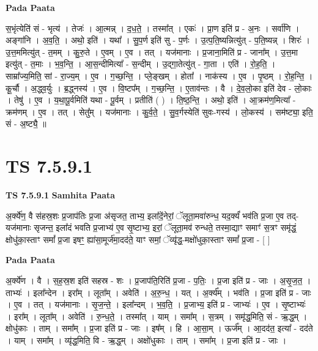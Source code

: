 \documentclass[17pt]{extarticle}
\begin{document}
\textbf{Pada Paata} \newline

स॒भृंत्येति॑ सं - भृत्य॑ । तेजः॑ । आ॒त्मन्न् । द॒ध॒ते॒ । तस्मा᳚त् । एकः॑ । प्रा॒ण इति॑ प्र - अ॒नः । सर्वा॑णि । अङ्गा॑नि । अ॒व॒ति॒ । अथो॒ इति॑ । यथा᳚ । सु॒प॒र्ण इति॑ सु - प॒र्णः । उ॒त्प॒ति॒ष्यन्नित्यु॑त् - प॒ति॒ष्यन्न् । शिरः॑ । उ॒त्त॒ममित्यु॑त् - त॒मम् । कु॒रु॒ते । ए॒वम् । ए॒व । तत् । यज॑मानाः । प्र॒जाना॒मिति॑ प्र - जाना᳚म् । उ॒त्त॒मा इत्यु॑त् - त॒माः । भ॒व॒न्ति॒ । आ॒स॒न्दीमित्या᳚ - स॒न्दीम् । उ॒द्गा॒तेत्यु॑त् - गा॒ता । एति॑ । रो॒ह॒ति॒ । साम्रा᳚ज्य॒मिति॒ सां - रा॒ज्य॒म् । ए॒व । ग॒च्छ॒न्ति॒ । प्ले॒ङ्खम् । होता᳚ । नाक॑स्य । ए॒व । पृ॒ष्ठम् । रो॒ह॒न्ति॒ । कू॒र्चौ । अ॒द्ध्व॒र्युः । ब्र॒द्ध्नस्य॑ । ए॒व । वि॒ष्टप᳚म् । ग॒च्छ॒न्ति॒ । ए॒ताव॑न्तः । वै । दे॒व॒लो॒का इति॑ देव - लो॒काः । तेषु॑ । ए॒व । य॒था॒पू॒र्वमिति॑ यथा - पू॒र्वम् । प्रतीति॑ ( ) । ति॒ष्ठ॒न्ति॒ । अथो॒ इति॑ । आ॒क्रम॑ण॒मित्या᳚ - क्रम॑णम् । ए॒व । तत् । सेतु᳚म् । यज॑मानाः । कु॒र्व॒ते॒ । सु॒व॒र्गस्येति॑ सुवः-गस्य॑ । लो॒कस्य॑ । सम॑ष्ट्या॒ इति॒ सं - अ॒ष्ट्यै॒ ॥  \newline




\section*{ TS 7.5.9.1 }

\textbf{TS 7.5.9.1 } \newline
\textbf{Samhita Paata} \newline

अ॒र्क्ये॑ण॒ वै स॑हस्र॒शः प्र॒जाप॑तिः प्र॒जा अ॑सृजत॒ ताभ्य॒ इला᳚दें॒नेरां॒ ॅलूता॒मवा॑रुन्ध॒ यद॒र्क्यं॑ भव॑ति प्र॒जा ए॒व तद्-यज॑मानाः सृजन्त॒ इला᳚दं भवति प्र॒जाभ्य॑ ए॒व सृ॒ष्टाभ्य॒ इरां॒ ॅलूता॒मव॑ रुन्धते॒ तस्मा॒द्याꣳ समाꣳ॑ स॒त्रꣳ समृ॑द्धं॒ क्षोधु॑का॒स्ताꣳ समां᳚ प्र॒जा इषꣳ॒॒ ह्या॑सा॒मूर्ज॑मा॒दद॑ते॒ याꣳ समां॒ ॅव्यृ॑द्ध॒-मक्षो॑धुका॒स्ताꣳ समां᳚ प्र॒जा - [  ] \newline

\textbf{Pada Paata} \newline

अ॒र्क्ये॑ण । वै । स॒ह॒स्र॒श इति॑ सहस्र - शः । प्र॒जाप॑ति॒रिति॑ प्र॒जा - प॒तिः॒ । प्र॒जा इति॑ प्र - जाः । अ॒सृ॒ज॒त॒ । ताभ्यः॑ । इला᳚न्देन । इरा᳚म् । लूता᳚म् । अवेति॑ । अ॒रु॒न्ध॒ । यत् । अ॒र्क्य᳚म् । भव॑ति । प्र॒जा इति॑ प्र - जाः । ए॒व । तत् । यज॑मानाः । सृ॒ज॒न्ते॒ । इला᳚न्दम् । भ॒व॒ति॒ । प्र॒जाभ्य॒ इति॑ प्र - जाभ्यः॑ । ए॒व । सृ॒ष्टाभ्यः॑ । इरा᳚म् । लूता᳚म् । अवेति॑ । रु॒न्ध॒ते॒ । तस्मा᳚त् । याम् । समा᳚म् । स॒त्रम् । समृ॑द्ध॒मिति॒ सं - ऋ॒द्ध॒म् । क्षोधु॑काः । ताम् । समा᳚म् । प्र॒जा इति॑ प्र - जाः । इष᳚म् । हि । आ॒सा॒म् । ऊर्ज᳚म् । आ॒दद॑त॒ इत्या᳚ - दद॑ते । याम् । समा᳚म् । व्यृ॑द्ध॒मिति॒ वि - ऋ॒द्ध॒म् । अक्षो॑धुकाः । ताम् । समा᳚म् । प्र॒जा इति॑ प्र - जाः ।  \newline
\end{document}
